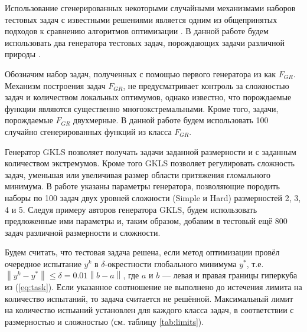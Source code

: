 \documentclass{svproc}
\begin{document}
\begin{Russian}

Использование сгенерированных некоторыми случайными механизмами
наборов тестовых задач с известными решениями является одним из общепринятых подходов
к сравнению алгоритмов оптимизации \cite{Beiranvand2017}. В данной работе
будем использовать два генератора тестовых задач, порождающих задачи различной природы \cite{grishaginClass, Gaviano2003}.

Обозначим набор задач, полученных с помощью первого генератора из \cite{grishaginClass} как \(F_{GR}\). Механизм построения задач \(F_{GR}\),
не предусматривает контроль за сложностью задач и количеством локальных оптимумов, однако известно, что порождаемые функции
являются существенно многоэкстремальными. Кроме того, задачи, порождаемые \(F_{GR}\) двухмерные. В данной работе будем использовать
100 случайно сгенерированных функций из класса \(F_{GR}\).

Генератор GKLS \cite{Gaviano2003} позволяет получать задачи заданной размерности и с заданным количеством экстремумов.
Кроме того GKLS позволяет регулировать сложность задач, уменьшая или увеличивая размер области притяжения гломального минимума.
В работе \cite{SergeyevKvasov2006} указаны параметры генератора, позволяющие породить наборы по 100 задач двух уровней сложности
(Simple и Hard) размерностей 2, 3, 4 и 5. Следуя примеру авторов генератора GKLS, будем использовать предложенные ими параметры и,
таким образом, добавим в тестовый ещё 800 задач различной размерности и сложности.

Будем считать, что тестовая задача решена, если метод оптимизации провёл очередное испытание \(y^k\) в
\(\delta\)-окрестности глобального минимума \(y^*\), т.е. $\left\|y^k-
y^*\right\|\leqslant \delta = 0.01\left\|b-a\right\|$, где \(a\) и \(b\) --- левая и правая границы гиперкуба из (\ref{eq:task}).
Если указанное соотношение не выполнено до истечения лимита на количество испытаний, то задача считается не решённой.
Максимальный лимит на количество испыаний установлен для каждого класса задач, в соответствии с размерностью и сложностью (см. таблицу \ref{tab:limits}).


\end{Russian}
\end{document}
